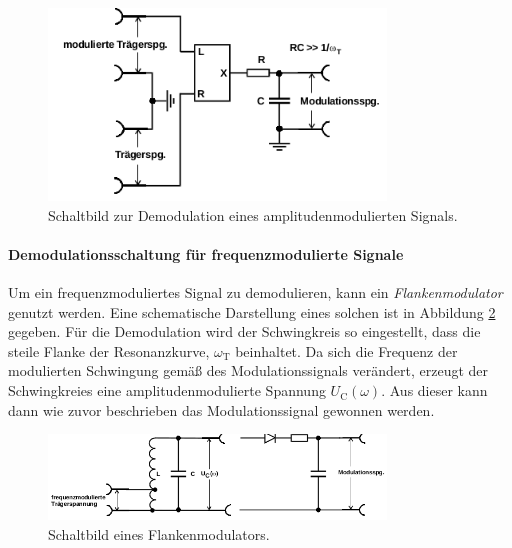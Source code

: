 \begin{figure}
  \centering
  \includegraphics[width=0.8\textwidth]{figures/demodulator.PNG}
  \caption{Schaltbild zur Demodulation eines amplitudenmodulierten Signals.\cite{sample}}
  \label{fig:demodulatorschaltung}
\end{figure}

\FloatBarrier

\paragraph{Demodulationsschaltung für frequenzmodulierte Signale}
Um ein frequenzmoduliertes Signal zu demodulieren, kann ein
\textit{Flankenmodulator} genutzt werden.
Eine schematische Darstellung eines solchen ist in Abbildung \ref{fig:flankenmodulator}
gegeben. Für die Demodulation wird der Schwingkreis so eingestellt, dass
die steile Flanke der Resonanzkurve, $\omega_{\text{T}}$ beinhaltet.
Da sich die Frequenz der modulierten Schwingung gemäß des Modulationssignals
verändert, erzeugt der Schwingkreies eine amplitudenmodulierte Spannung
$U_{\text{C}}(\omega)$. Aus dieser kann dann wie zuvor beschrieben das
Modulationssignal gewonnen werden.


\begin{figure}
  \centering
  \includegraphics[width=0.8\textwidth]{figures/flankenmodulator.PNG}
  \caption{Schaltbild eines Flankenmodulators.\cite{sample}}
  \label{fig:flankenmodulator}
\end{figure}
